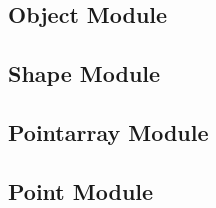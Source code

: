 %

\subsection{Object Module}
\subsection{Shape Module}
\subsection{Pointarray Module}
\subsection{Point Module}



